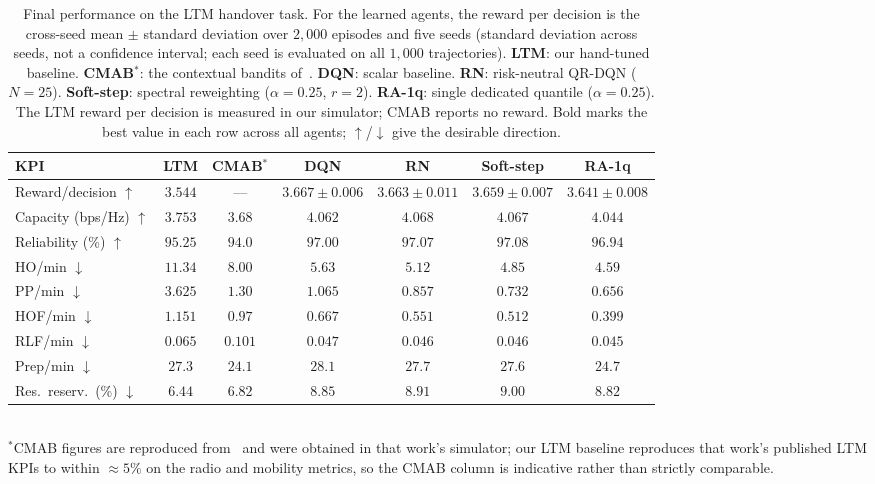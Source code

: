 \documentclass[conference]{IEEEtran}
\begin{document}
\begin{table}[t]
\caption{Final performance on the LTM handover task. For the learned agents, the
reward per decision is the cross-seed mean $\pm$ standard deviation over
$2{,}000$ episodes and five seeds (standard deviation across seeds, not a
confidence interval; each seed is evaluated on all $1{,}000$ trajectories).
\textbf{LTM}: our hand-tuned baseline. \textbf{CMAB}$^{*}$: the contextual bandits
of~\cite{cmab_ho}. \textbf{DQN}: scalar baseline. \textbf{RN}: risk-neutral QR-DQN
($N{=}25$). \textbf{Soft-step}: spectral reweighting ($\alpha{=}0.25$, $r{=}2$).
\textbf{RA-1q}: single dedicated quantile ($\alpha{=}0.25$). The LTM reward per
decision is measured in our simulator; CMAB reports no reward. Bold marks the best
value in each row across all agents; $\uparrow$/$\downarrow$ give the desirable
direction.}
\label{tab:final}
\centering
\setlength{\tabcolsep}{5pt}
\begin{tabular}{|l|c|c|c|c|c|c|}
\hline
\textbf{KPI} & \textbf{LTM} & \textbf{CMAB}$^{*}$ & \textbf{DQN} & \textbf{RN} & \textbf{Soft-step} & \textbf{RA-1q} \\
\hline
Reward/decision $\uparrow$          & $3.544$ & --- & $\mathbf{3.667{\pm}0.006}$ & $3.663{\pm}0.011$ & $3.659{\pm}0.007$ & $3.641{\pm}0.008$ \\
Capacity (bps/Hz) $\uparrow$        & $3.753$ & $3.68$ & $4.062$ & $\mathbf{4.068}$ & $4.067$ & $4.044$ \\
Reliability (\%) $\uparrow$         & $95.25$ & $94.0$ & $97.00$ & $97.07$ & $\mathbf{97.08}$ & $96.94$ \\
HO/min $\downarrow$                 & $11.34$ & $8.00$ & $5.63$ & $5.12$ & $4.85$ & $\mathbf{4.59}$ \\
PP/min $\downarrow$                 & $3.625$ & $1.30$ & $1.065$ & $0.857$ & $0.732$ & $\mathbf{0.656}$ \\
HOF/min $\downarrow$                & $1.151$ & $0.97$ & $0.667$ & $0.551$ & $0.512$ & $\mathbf{0.399}$ \\
RLF/min $\downarrow$                & $0.065$ & $0.101$ & $0.047$ & $0.046$ & $0.046$ & $\mathbf{0.045}$ \\
Prep/min $\downarrow$               & $27.3$ & $\mathbf{24.1}$ & $28.1$ & $27.7$ & $27.6$ & $24.7$ \\
Res.\ reserv.\ (\%) $\downarrow$    & $\mathbf{6.44}$ & $6.82$ & $8.85$ & $8.91$ & $9.00$ & $8.82$ \\
\hline
\end{tabular}
{\footnotesize\\[2pt]$^{*}$CMAB figures are reproduced from~\cite{cmab_ho} and were
obtained in that work's simulator; our LTM baseline reproduces that work's
published LTM KPIs to within ${\approx}5\%$ on the radio and mobility metrics, so
the CMAB column is indicative rather than strictly comparable.}
\end{table}
\end{document}
